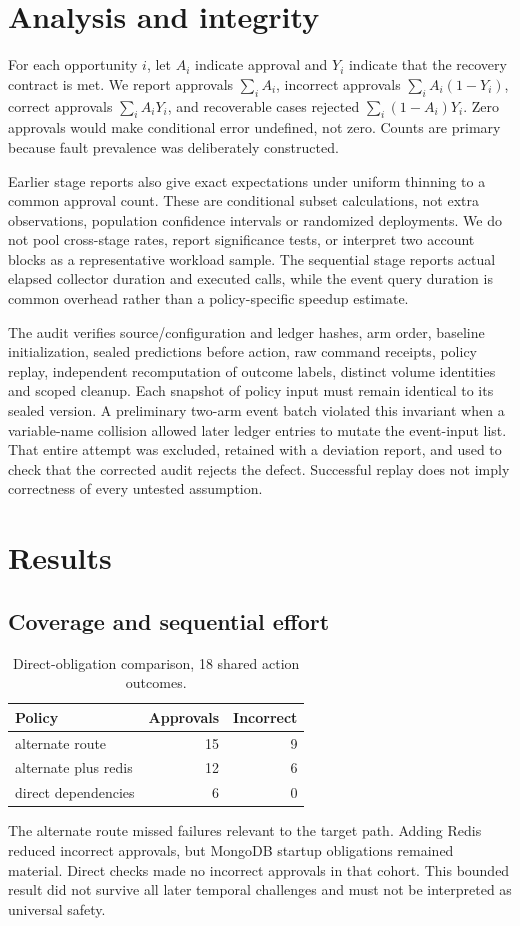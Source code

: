 \documentclass[manuscript,review,nonacm]{acmart}
\begin{document}
\section{Analysis and integrity}
For each opportunity $i$, let $A_i$ indicate approval and $Y_i$ indicate that the recovery contract is met. We report approvals $\sum_i A_i$, incorrect approvals $\sum_i A_i(1-Y_i)$, correct approvals $\sum_i A_iY_i$, and recoverable cases rejected $\sum_i(1-A_i)Y_i$. Zero approvals would make conditional error undefined, not zero. Counts are primary because fault prevalence was deliberately constructed.

Earlier stage reports also give exact expectations under uniform thinning to a common approval count. These are conditional subset calculations, not extra observations, population confidence intervals or randomized deployments. We do not pool cross-stage rates, report significance tests, or interpret two account blocks as a representative workload sample. The sequential stage reports actual elapsed collector duration and executed calls, while the event query duration is common overhead rather than a policy-specific speedup estimate.

The audit verifies source/configuration and ledger hashes, arm order, baseline initialization, sealed predictions before action, raw command receipts, policy replay, independent recomputation of outcome labels, distinct volume identities and scoped cleanup. Each snapshot of policy input must remain identical to its sealed version. A preliminary two-arm event batch violated this invariant when a variable-name collision allowed later ledger entries to mutate the event-input list. That entire attempt was excluded, retained with a deviation report, and used to check that the corrected audit rejects the defect. Successful replay does not imply correctness of every untested assumption.

\section{Results}
\subsection{Coverage and sequential effort}
\begin{table}[t]
\caption{Direct-obligation comparison, 18 shared action outcomes.}
\label{tab:policy-3-3}
\centering
\begin{tabularx}{\linewidth}{@{}Xrr@{}}
\toprule
Policy & Approvals & Incorrect \\
\midrule
alternate route & 15 & 9 \\
alternate plus redis & 12 & 6 \\
direct dependencies & 6 & 0 \\
\bottomrule
\end{tabularx}
\end{table}
The alternate route missed failures relevant to the target path. Adding Redis reduced incorrect approvals, but MongoDB startup obligations remained material. Direct checks made no incorrect approvals in that cohort. This bounded result did not survive all later temporal challenges and must not be interpreted as universal safety.
\end{document}
